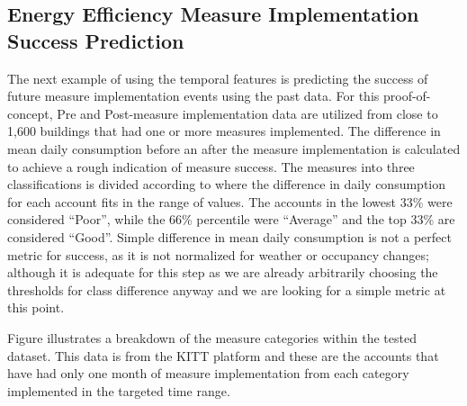 \subsection{Energy Efficiency Measure Implementation Success Prediction}
\label{sec:measuresuccess}

The next example of using the temporal features is predicting the success of future measure implementation events using the past data. For this proof-of-concept, Pre and Post-measure implementation data are utilized from close to 1,600 buildings that had one or more measures implemented. The difference in mean daily consumption before an after the measure implementation is calculated to achieve a rough indication of measure success. The measures into three classifications is divided according to where the difference in daily consumption for each account fits in the range of values. The accounts in the lowest 33\% were considered “Poor”, while the 66\% percentile were “Average” and the top 33\% are considered “Good”. Simple difference in mean daily consumption is not a perfect metric for success, as it is not normalized for weather or occupancy changes; although it is adequate for this step as we are already arbitrarily choosing the thresholds for class difference anyway and we are looking for a simple metric at this point. 


Figure  illustrates a breakdown of the measure categories within the tested dataset. This data is from the KITT platform and these are the accounts that have had only one month of measure implementation from each category implemented in the targeted time range.